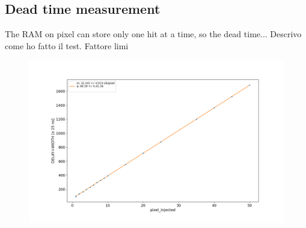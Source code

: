     \subsection{Dead time measurement}
        The RAM on pixel can store only one hit at a time, so the dead time...
        Descrivo come ho fatto il test. 
        Fattore limi
        \begin{figure}[h!]
                \centering
                \includegraphics[width=.7\linewidth]{figures/Monopix1/dead_time.png}
                \caption{}
                \label{fig:dead_time}
            \end{figure}

    
